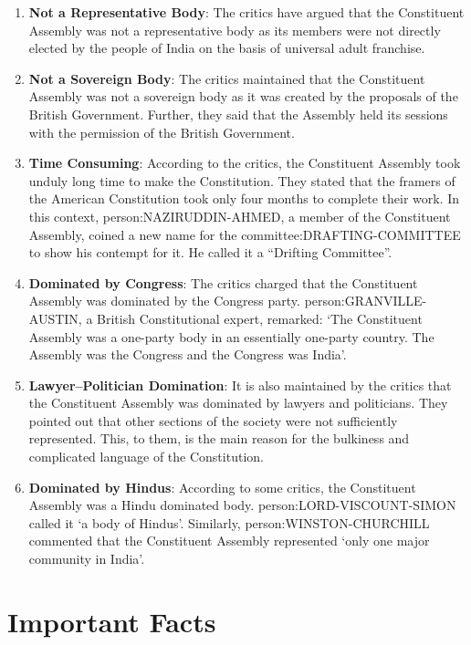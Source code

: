 \begin{enumerate}
  \item \textbf{Not a Representative Body}: The critics have argued that the Constituent  Assembly was not a representative body as its members were not directly elected by the people of India on the basis of universal adult franchise.
  \item \textbf{Not a Sovereign Body}: The critics maintained that the Constituent Assembly was not a sovereign body as it was created by the proposals of the British Government. Further, they said that the Assembly held its sessions with the permission of the British Government.
  \item \textbf{Time Consuming}: According to the critics, the Constituent Assembly took unduly long time to make the Constitution. They stated that the framers of the American Constitution took only four months to complete their work. In this context, \gls{person:NAZIRUDDIN-AHMED}, a member of the Constituent Assembly, coined a new name for the \gls{committee:DRAFTING-COMMITTEE} to show his contempt for it. He called it a ``Drifting Committee''.
  \item \textbf{Dominated by Congress}: The critics charged that the Constituent Assembly was dominated by the Congress party. \gls{person:GRANVILLE-AUSTIN}, a British Constitutional expert, remarked: `The Constituent Assembly was a one-party body in an essentially one-party country. The Assembly was the Congress and the Congress was India'.
  \item \textbf{Lawyer–Politician Domination}: It is also maintained by the critics that the Constituent Assembly was dominated by lawyers and politicians. They pointed out that other sections of the society were not sufficiently represented. This, to them, is the main reason for the bulkiness and complicated language of the Constitution.
  \item \textbf{Dominated by Hindus}: According to some critics, the Constituent Assembly was a Hindu dominated body. \gls{person:LORD-VISCOUNT-SIMON} called it `a body of Hindus'. Similarly, \gls{person:WINSTON-CHURCHILL} commented that the Constituent Assembly represented `only one major community in India'.
\end{enumerate}


\section{Important Facts}

